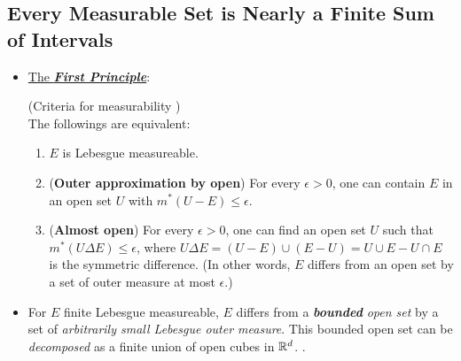 \documentclass[11pt]{article}
\begin{document}
\subsection{Every Measurable Set is Nearly a Finite Sum of Intervals}
\begin{itemize}
\item  \underline{The \textbf{\emph{First Principle}}}: 
 \begin{proposition} (Criteria for measurability \citep{tao2011introduction})\\
The followings are equivalent:
\begin{enumerate}
\item $E$ is Lebesgue measureable.
\item (\textbf{Outer approximation by open}) For every $\epsilon>0$, one can contain $E$ in an open set $U$ with $m^{*}(U-E)\le \epsilon $.
\item (\textbf{Almost open}) For every $\epsilon>0$, one can find an open set $U$ such that  $m^{*}(U\Delta E)\le \epsilon $, where $U\Delta E = (U-E)\cup (E-U) = U\cup E - U\cap E$ is the symmetric difference. (In other words, $E$ differs from an open set by a set of outer measure at most $\epsilon$.) 
\end{enumerate}
\end{proposition}

\item \begin{remark}
For $E$ finite Lebesgue measureable, $E$ differs from a \emph{\textbf{bounded}} \emph{open set} by a set of \emph{arbitrarily small Lebesgue outer measure}. This bounded open set can be \emph{decomposed} as a finite union of open cubes in ${\mathbb R}^{d}$. \citep{royden1988real}.
\end{remark}
\end{itemize}
\end{document}
